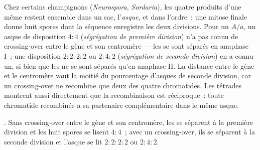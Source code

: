 \begin{proposition}\label{prop:b2:meiosis-heredity:tetrads}
Chez certains champignons (\emph{Neurospora}, \emph{Sordaria}), les
quatre produits d'une même  restent ensemble dans un sac,
l'\emph{asque}, et dans l'ordre~: une mitose finale donne huit spores
dont la séquence enregistre les deux divisions. Pour un 
$A/a$, un asque de disposition
$4 : 4$ (\emph{ségrégation de première division}) n'a pas connu de
crossing-over entre le gène et son centromère --- les  se sont
séparés en anaphase I~; une disposition $2 : 2 : 2 : 2$ ou $2 : 4 : 2$
(\emph{ségrégation de seconde division}) en a connu un, si bien que les
 ne se sont séparés qu'en anaphase II. La distance entre le gène
et le centromère vaut la moitié du pourcentage d'asques de seconde
division, car un crossing-over ne recombine que deux des quatre
chromatides. Les tétrades montrent aussi directement que la
recombinaison est réciproque~: toute chromatide recombinée a sa
partenaire complémentaire dans le même asque.
\end{proposition}

\begin{omfigure}

{\small {}. Sans crossing-over entre le gène et son
centromère, les  se séparent à la première division et les huit
spores se lisent $4 : 4$~; avec un crossing-over, ils se séparent à la
seconde division et l'asque se lit $2 : 2 : 2 : 2$ ou $2 : 4 : 2$.}
\end{omfigure}

